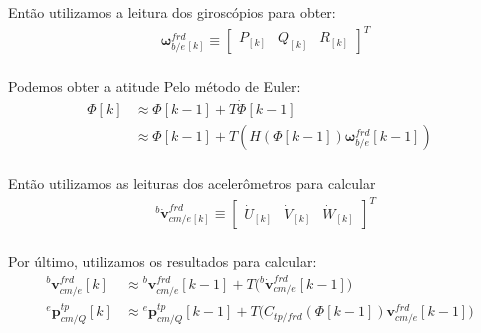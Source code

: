 Então utilizamos a leitura dos giroscópios para obter:
\begin{align*}
     &\mathbf{\omega}^{frd}_{b/e}_{\left[k\right]}
        \equiv \begin{bmatrix} P_{\left[k\right]} & Q_{\left[k\right]} & R_{\left[k\right]} \end{bmatrix}^{T}
        \text{} \\
\end{align*}

Podemos obter a atitude Pelo método de Euler\footnotemark{}:
\begin{align*}
{\Phi}{\left[ k \right]} 
    &\approx {\Phi} {\left[ k-1 \right]} + T {\dot{\Phi}{\left[ k -1 \right]}} \\
    &\approx {\Phi} {\left[ k-1 \right]} + T {\left( H {\left( \Phi{\left[ k-1 \right]} \right)}{\mathbf{\omega}^{frd}_{b/e}}{\left[ k-1 \right]}\right)} \\
\end{align*}

Então utilizamos as leituras dos acelerômetros para calcular
\begin{align*}
    &{^{b}{\dot{\mathbf{v}}}^{frd}_{cm/e}_\left[k\right]}
        \equiv \begin{bmatrix} {\dot{U}}_{\left[k\right]} & {\dot{V}_{\left[k\right]}} & {\dot{W}_{\left[k\right]}} \end{bmatrix}^{T}
        \text{} \\
\end{align*}

Por último, utilizamos os resultados para calcular:
\begin{align*}
    {^{b}{{\mathbf{v}}}^{frd}_{cm/e}{\left[k\right]}}
        &\approx {^{b}{{\mathbf{v}}}^{frd}_{cm/e}}{\left[ k-1 \right]}
        + T \Big({^{b}{\dot{\mathbf{v}}}^{frd}_{cm/e}{\left[k -1\right]}}\Big) \\
    {^{e}{\mathbf{p}^{tp}_{cm/Q}}\left[k\right]}
    &\approx     {^{e}{\mathbf{p}^{tp}_{cm/Q}}\left[k-1\right]}
    + T \Big({C_{tp/frd}\left({\Phi}{\left[ k-1 \right]} \right)} {\mathbf{v}^{frd}_{cm/e}{\left[ k-1 \right]}}\Big) \\
\end{align*}
%
